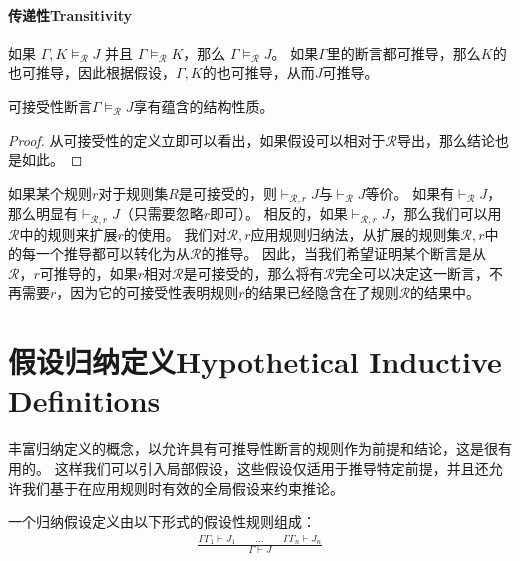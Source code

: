\paragraph{传递性Transitivity} 
如果 $\Gamma,K \vDash_{\mathcal{R}} J$ 并且 $\Gamma \vDash_{\mathcal{R}} K$，那么 $\Gamma \vDash_{\mathcal{R}} J$。 如果$\Gamma$里的断言都可推导，那么$K$的也可推导，因此根据假设，$\Gamma,K$的也可推导，从而$J$可推导。

\begin{theorem}[]
    可接受性断言$\Gamma \vDash_{\mathcal{R}} J$享有蕴含的结构性质。
\end{theorem}
\begin{proof}
    从可接受性的定义立即可以看出，如果假设可以相对于$ \mathcal{R} $导出，那么结论也是如此。
\end{proof}

如果某个规则$r$对于规则集$ R $是可接受的，则$ \vdash_{\mathcal{R},r} J $与$ \vdash_{\mathcal{R}} J $等价。
如果有$\vdash_{\mathcal{R}} J$，那么明显有$\vdash_{\mathcal{R},r} J$（只需要忽略$r$即可）。
相反的，如果$\vdash_{\mathcal{R},r} J$，那么我们可以用$\mathcal{R}$中的规则来扩展$r$的使用。
我们对$ \mathcal{R},r $应用规则归纳法，从扩展的规则集$ \mathcal{R},r $中的每一个推导都可以转化为从$ \mathcal{R} $的推导。
因此，当我们希望证明某个断言是从$ \mathcal{R}，r $可推导的，如果$ r $相对$ \mathcal{R} $是可接受的，那么将有$ \mathcal{R} $完全可以决定这一断言，不再需要$r$，因为它的可接受性表明规则$ r $的结果已经隐含在了规则$ \mathcal{R} $的结果中。

\section{假设归纳定义Hypothetical Inductive Definitions}
丰富归纳定义的概念，以允许具有可推导性断言的规则作为前提和结论，这是很有用的。
这样我们可以引入局部假设，这些假设仅适用于推导特定前提，并且还允许我们基于在应用规则时有效的全局假设来约束推论。

一个归纳假设定义由以下形式的假设性规则组成：
\begin{equation}
    \begin{aligned}
        \frac{\Gamma \Gamma_1 \vdash J_1 \qquad \dots \qquad \Gamma \Gamma_n \vdash J_n}{\Gamma \vdash J} \label{equation:three_nine}
    \end{aligned}
\end{equation}

